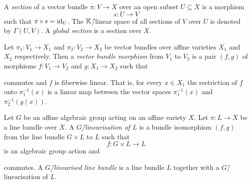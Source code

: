\begin{defi}
	A \emph{section} of a vector bundle $\pi\colon V \rightarrow X$ over an open subset $U\subseteq X$ is a morphism
	$$s\colon U \longrightarrow V$$
	such that $\pi \circ s = \text{id}_U$. The $\mathbb{K}$\=/linear space of all sections of $V$ over $U$ is denoted by $\Gamma(U,V)$. A \emph{global section} is a section over $X$.
\end{defi}

\begin{defi}
	Let $\pi_1\colon V_1 \rightarrow X_1$ and $\pi_2\colon V_2 \rightarrow X_2$ be vector bundles over affine varieties $X_1$ and $X_2$ respectively. Then a \emph{vector bundle morphism} from $V_1$ to $V_2$ is a pair $(f,g)$ of morphisms $f\colon V_1 \rightarrow V_2$ and $g\colon X_1 \rightarrow X_2$ such that
	\begin{center}
	\end{center}
	commutes and $f$ is fiberwise linear. That is, for every $x\in X_1$ the restriction of $f$ onto $\pi_1^{-1}(x)$ is a linear map between the vector spaces $\pi_1^{-1}(x)$ and $\pi_2^{-1}(g(x))$.
\end{defi}

\begin{defi}[$G$\=/linearisation of a line bundle, \phantom{}{\cite[chapter 1.3]{git}}]
	Let $G$ be an affine algebraic group acting on an affine variety $X$. Let $\pi\colon L \rightarrow X$ be a line bundle over $X$. A \emph{$G$\=/linearisation of $L$} is a bundle isomorphism $(f,g)$ from the line bundle $G\times L$ to $L$ such that
	$$f\colon G\times L \longrightarrow L$$
	is an algebraic group action and
	\begin{center}
	\end{center}
	commutes. A \emph{$G$\=/linearised line bundle} is a line bundle $L$ together with a  $G$\=/linearisation of $L$.
\end{defi}

